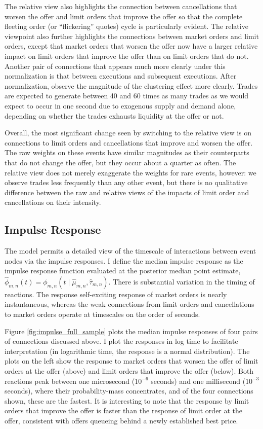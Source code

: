 		The relative view also highlights the connection between cancellations that worsen the offer and limit orders that improve the offer so that the complete fleeting order (or ``flickering'' quotes) cycle is particularly evident. The relative viewpoint also further highlights the connections between market orders and limit orders, except that market orders that worsen the offer now have a larger relative impact on limit orders that improve the offer than on limit orders that do not. Another pair of connections that appears much more clearly under this normalization is that between executions and subsequent executions. After normalization, observe the magnitude of the clustering effect more clearly. Trades are expected to generate between 40 and 60 times as many trades as we would expect to occur in one second due to exogenous supply and demand alone, depending on whether the trades exhausts liquidity at the offer or not.

		Overall, the most significant change seen by switching to the relative view is on connections to limit orders and cancellations that improve and worsen the offer. The raw weights on these events have similar magnitudes as their counterparts that do not change the offer, but they occur about a quarter as often. The relative view does not merely exaggerate the weights for rare events, however: we observe trades less frequently than any other event, but there is no qualitative difference between the raw and relative views of the impacts of limit order and cancellations on their intensity.

	\subsection{Impulse Response}
		The model permits a detailed view of the timescale of interactions between event nodes via the impulse responses. I define the median impulse response as the impulse response function evaluated at the posterior median point estimate, $\hat{\phi}_{m,n}(t) = \phi_{m,n} \left( t \mid \hat{\mu}_{m,n}, \hat{\tau}_{m,n} \right)$. There is substantial variation in the timing of reactions. The response self-exciting response of market orders is nearly instantaneous, whereas the weak connections from limit orders and cancellations to market orders operate at timescales on the order of seconds.

		Figure \ref{fig:impulse_full_sample} plots the median impulse responses of four pairs of connections discussed above. I plot the responses in log time to facilitate interpretation (in logarithmic time, the response is a normal distribution). The plots on the left show the response to market orders that worsen the offer of limit orders at the offer (above) and limit orders that improve the offer (below). Both reactions peak between one microsecond ($10^{-6}$ seconds) and one millisecond ($10^{-3}$ seconds), where their probability-mass concentrates, and of the four connections shown, these are the fastest. It is interesting to note that the response by limit orders that improve the offer is faster than the response of limit order at the offer, consistent with offers queueing behind a newly established best price.

